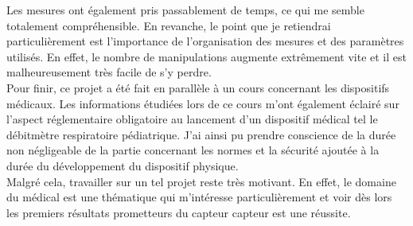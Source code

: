 Les mesures ont également pris passablement de temps, ce qui me semble totalement compréhensible. En revanche, le point que je retiendrai particulièrement 
est l'importance de l'organisation des mesures et des paramètres utilisés. En effet, le nombre de manipulations augmente extrêmement vite et 
il est malheureusement très facile de s'y perdre. \\

Pour finir, ce projet a été fait en parallèle à un cours concernant les dispositifs médicaux. Les informations étudiées lors de ce cours m'ont également 
éclairé sur l'aspect réglementaire obligatoire au lancement d'un dispositif médical tel le débitmètre respiratoire pédiatrique. J'ai ainsi pu 
prendre conscience de la durée non négligeable de la partie concernant les normes et la sécurité ajoutée à la durée du développement du dispositif 
physique. \\

Malgré cela, travailler sur un tel projet reste très motivant. En effet, le domaine du médical est une thématique qui m'intéresse particulièrement 
et voir dès lors les premiers résultats prometteurs du capteur \gls{capteur} est une réussite. 


\vfil
\hspace{8cm}\makeatletter\@author\makeatother\par
\hspace{8cm}\begin{minipage}{5cm}
    \printsignature
\end{minipage}